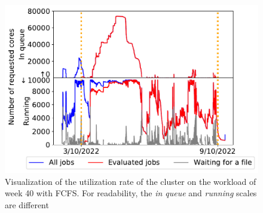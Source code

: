 \documentclass[sigconf,review,anonymous]{acmart}
\begin{document}
\begin{figure}[t]\centering\includegraphics[width=0.9\linewidth]{../MBSS/plot/Cluster_usage/2022-10-03->2022-10-09_V10000_anonymous_Fcfs_Used_nodes_450_128_32_256_4_1024_core_by_core.pdf}\caption{Visualization
of the utilization rate of the cluster on the workload of week 40 with
FCFS. For readability, the \emph{in queue} and \emph{running} scales are
different}\label{40_cluster_usage_fcfs}\end{figure}
\end{document}
